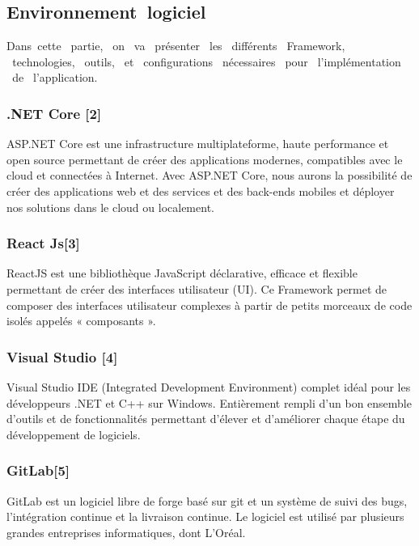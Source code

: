 \newpage
\subsection{Environnement\textcolor{white}{J}logiciel}
Dans\textcolor{white}{J}cette \textcolor{white}{J}partie, \textcolor{white}{J}on \textcolor{white}{J}va \textcolor{white}{J}présenter \textcolor{white}{J}les \textcolor{white}{J}différents \textcolor{white}{J}Framework, \textcolor{white}{J}technologies, \textcolor{white}{J}outils, \textcolor{white}{J}et \textcolor{white}{J}configurations \textcolor{white}{J}nécessaires \textcolor{white}{J}pour \textcolor{white}{J}l’implémentation \textcolor{white}{J}de \textcolor{white}{J}l’application.

\subsubsection*{.NET Core [2]}
ASP.NET Core est une infrastructure multiplateforme, haute performance et open source permettant de créer des applications modernes, compatibles avec le cloud et connectées à Internet. Avec ASP.NET Core, nous aurons la possibilité de créer des applications web et des services et des back-ends mobiles et déployer nos solutions dans le cloud ou localement.



\subsubsection*{React Js[3]}
ReactJS est une bibliothèque JavaScript déclarative, efficace et flexible permettant de créer des interfaces utilisateur (UI). Ce Framework permet de composer des interfaces utilisateur complexes à partir de petits morceaux de code isolés appelés « composants ».


\subsubsection*{Visual Studio [4]}
Visual Studio IDE (Integrated Development Environment) complet idéal pour les développeurs .NET et C++ sur Windows. Entièrement rempli d’un bon ensemble d’outils et de fonctionnalités permettant d’élever et d’améliorer chaque étape du développement de logiciels. 



\subsubsection*{GitLab[5]}
GitLab est un logiciel libre de forge basé sur git et un système de suivi des bugs, l’intégration continue et la livraison continue. Le logiciel est utilisé par plusieurs grandes entreprises informatiques, dont L’Oréal.




